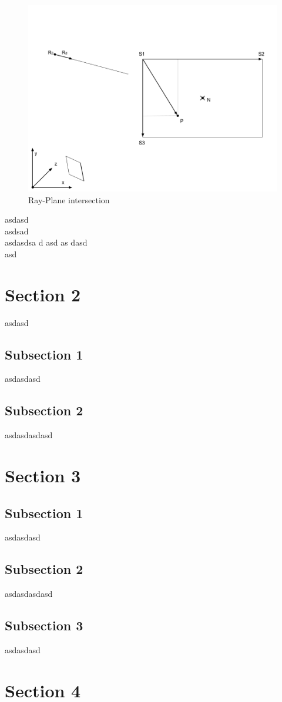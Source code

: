 \begin{figure}[h!]\label{fig:ray-plane}
\centering
\includegraphics[width=\linewidth]{Figures/ray-plane-intersection.png}
\decoRule
\caption[ray-plane-intersection]{Ray-Plane intersection}
\end{figure}

asdasd\\
asdsad\\
asdasdsa
d
asd
as
dasd\\
asd




\section{Section 2}
asdasd

\subsection{Subsection 1}
asdasdasd

\subsection{Subsection 2}
asdasdasdasd

\section{Section 3}

\subsection{Subsection 1}
asdasdasd

\subsection{Subsection 2}
asdasdasdasd

\subsection{Subsection 3}
asdasdasd

\section{Section 4}

